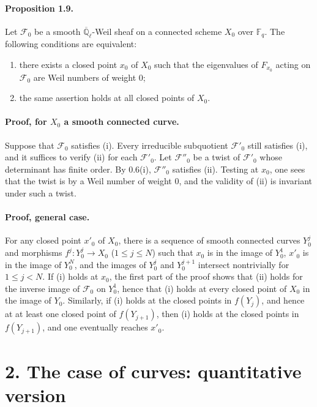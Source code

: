 \documentclass[10pt]{article}
\newcommand{\F}{\mathbb{F}}
\newcommand{\Ql}{\overline{\mathbb Q}_{\ell}}
\begin{document}
\paragraph{Proposition 1.9.}
Let $\mathcal F_0$ be a smooth $\Ql$-Weil sheaf on a connected scheme $X_0$ over $\F_q$.
The following conditions are equivalent:
\begin{enumerate}[label=(\roman*)]
\item there exists a closed point $x_0$ of $X_0$ such that the eigenvalues of $F_{x_0}$ acting on $\mathcal F_0$ are Weil numbers of weight $0$;
\item the same assertion holds at all closed points of $X_0$.
\end{enumerate}

\paragraph{Proof, for $X_0$ a smooth connected curve.}
Suppose that $\mathcal F_0$ satisfies (i).
Every irreducible subquotient $\mathcal F'_0$ still satisfies (i), and it suffices to verify (ii) for each $\mathcal F'_0$.
Let $\mathcal F''_0$ be a twist of $\mathcal F'_0$ whose determinant has finite order.
By 0.6(i), $\mathcal F''_0$ satisfies (ii).
Testing at $x_0$, one sees that the twist is by a Weil number of weight $0$, and the validity of (ii) is invariant under such a twist.

\paragraph{Proof, general case.}
For any closed point $x'_0$ of $X_0$, there is a sequence of smooth connected curves $Y_0^j$ and morphisms $f^j:Y_0^j\to X_0$ ($1\le j\le N$) such that $x_0$ is in the image of $Y_0^1$, $x'_0$ is in the image of $Y_0^N$, and the images of $Y_0^j$ and $Y_0^{j+1}$ intersect nontrivially for $1\le j<N$.
If (i) holds at $x_0$, the first part of the proof shows that (ii) holds for the inverse image of $\mathcal F_0$ on $Y_0^1$, hence that (i) holds at every closed point of $X_0$ in the image of $Y_0$.
Similarly, if (i) holds at the closed points in $f(Y_j)$, and hence at at least one closed point of $f(Y_{j+1})$, then (i) holds at the closed points in $f(Y_{j+1})$, and one eventually reaches $x'_0$.

\section*{2. The case of curves: quantitative version}
\end{document}
